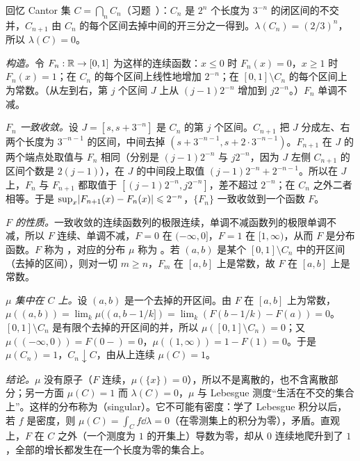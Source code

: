 \begin{example}[Cantor 分布]\label{ex:distributions:cantor}
回忆 Cantor 集 $C=\bigcap_nC_n$（习题~）：$C_n$ 是 $2^n$ 个长度为 $3^{-n}$ 的闭区间的不交并，$C_{n+1}$ 由 $C_n$ 的每个区间去掉中间的开三分之一得到。$\lambda(C_n)=(2/3)^n$，所以 $\lambda(C)=0$。

\emph{构造。}令 $F_n:\mathbb{R}\to[0,1]$ 为这样的连续函数：$x\leqslant0$ 时 $F_n(x)=0$，$x\geqslant1$ 时 $F_n(x)=1$；在 $C_n$ 的每个区间上线性地增加 $2^{-n}$；在 $[0,1]\setminus C_n$ 的每个区间上为常数。（从左到右，第 $j$ 个区间 $J$ 上从 $(j-1)2^{-n}$ 增加到 $j2^{-n}$。）$F_n$ 单调不减。

\emph{$F_n$ 一致收敛。}设 $J=[s,s+3^{-n}]$ 是 $C_n$ 的第 $j$ 个区间。$C_{n+1}$ 把 $J$ 分成左、右两个长度为 $3^{-n-1}$ 的区间，中间去掉 $(s+3^{-n-1},s+2\cdot3^{-n-1})$。$F_{n+1}$ 在 $J$ 的两个端点处取值与 $F_n$ 相同（分别是 $(j-1)2^{-n}$ 与 $j2^{-n}$，因为 $J$ 左侧 $C_{n+1}$ 的区间个数是 $2(j-1)$），在 $J$ 的中间段上取值 $(j-1)2^{-n}+2^{-n-1}$。所以在 $J$ 上，$F_n$ 与 $F_{n+1}$ 都取值于 $[(j-1)2^{-n},j2^{-n}]$，差不超过 $2^{-n}$；在 $C_n$ 之外二者相等。于是 $\sup_x\lvert F_{n+1}(x)-F_n(x)\rvert\leqslant2^{-n}$，$\{F_n\}$ 一致收敛到一个函数 $F$。

\emph{$F$ 的性质。}一致收敛的连续函数列的极限连续，单调不减函数列的极限单调不减，所以 $F$ 连续、单调不减，$F=0$ 在 $(-\infty,0]$，$F=1$ 在 $[1,\infty)$，从而 $F$ 是分布函数。$F$ 称为 ，对应的分布 $\mu$ 称为 。若 $(a,b)$ 是某个 $[0,1]\setminus C_n$ 中的开区间（去掉的区间），则对一切 $m\geqslant n$，$F_m$ 在 $[a,b]$ 上是常数，故 $F$ 在 $[a,b]$ 上是常数。

\emph{$\mu$ 集中在 $C$ 上。}设 $(a,b)$ 是一个去掉的开区间。由 $F$ 在 $[a,b]$ 上为常数，$\mu((a,b))=\lim_k\mu((a,b-1/k])=\lim_k(F(b-1/k)-F(a))=0$。$[0,1]\setminus C_n$ 是有限个去掉的开区间的并，所以 $\mu([0,1]\setminus C_n)=0$；又 $\mu((-\infty,0))=F(0-)=0$，$\mu((1,\infty))=1-F(1)=0$。于是 $\mu(C_n)=1$，$C_n\downarrow C$，由从上连续 $\mu(C)=1$。

\emph{结论。}$\mu$ 没有原子（$F$ 连续，$\mu(\{x\})=0$），所以不是离散的，也不含离散部分；另一方面 $\mu(C)=1$ 而 $\lambda(C)=0$，$\mu$ 与 Lebesgue 测度“生活在不交的集合上”。这样的分布称为（singular）。它不可能有密度：学了 Lebesgue 积分以后，若 $f$ 是密度，则 $\mu(C)=\int_Cf\dd\lambda=0$（在零测集上的积分为零），矛盾。直观上，$F$ 在 $C$ 之外（一个测度为 $1$ 的开集上）导数为零，却从 $0$ 连续地爬升到了 $1$，全部的增长都发生在一个长度为零的集合上。
\end{example}

